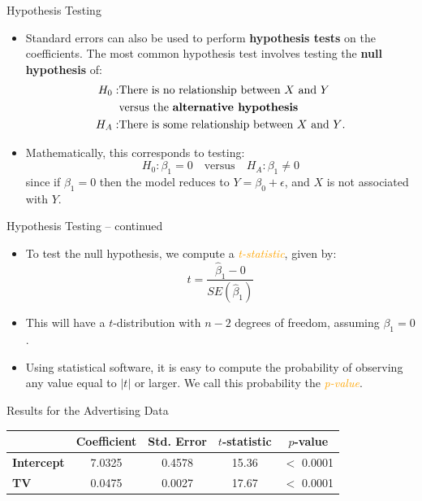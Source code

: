\documentclass[aspectratio=169, 11pt]{beamer}
\begin{document}
\begin{frame}{Hypothesis Testing}
  \begin{itemize}
    \item Standard errors can also be used to perform \textbf{hypothesis tests} on the coefficients. The most common hypothesis test involves testing the \textbf{null hypothesis} of:
    \begin{align*}
      H_0 :& \text{There is no relationship between } X \text{ and } Y \\
           & \text{versus the \textbf{alternative hypothesis}} \\
      H_A :& \text{There is some relationship between } X \text{ and } Y\text{.}
    \end{align*}
    \pause
    \item Mathematically, this corresponds to testing:
    \[ H_0: \beta_1 = 0 \quad \text{versus} \quad H_A: \beta_1 \neq 0 \]
    since if $\beta_1 = 0$ then the model reduces to $Y = \beta_0 + \epsilon$, and $X$ is not associated with $Y$.
  \end{itemize}
\end{frame}

\begin{frame}{Hypothesis Testing -- continued}
  \begin{itemize}
    \item To test the null hypothesis, we compute a \textcolor{orange}{\textit{t-statistic}}, given by:
    \[ t = \frac{\hat{\beta}_1 - 0}{SE(\hat{\beta}_1)} \]
    \item This will have a $t$-distribution with $n-2$ degrees of freedom, assuming $\beta_1 = 0$.
    \item Using statistical software, it is easy to compute the probability of observing any value equal to $|t|$ or larger. We call this probability the \textcolor{orange}{\textit{p-value}}.
  \end{itemize}
\end{frame}

\begin{frame}{Results for the Advertising Data}
  \begin{table}
    \centering
    \begin{tabular}{l c c c c}
      \toprule
      & \textbf{Coefficient} & \textbf{Std. Error} & \textbf{$t$-statistic} & \textbf{$p$-value} \\
      \midrule
      \textbf{Intercept} & 7.0325 & 0.4578 & 15.36 & $<$ 0.0001 \\
      \textbf{TV}        & 0.0475 & 0.0027 & 17.67 & $<$ 0.0001 \\
      \bottomrule
    \end{tabular}
  \end{table}
\end{frame}
\end{document}

